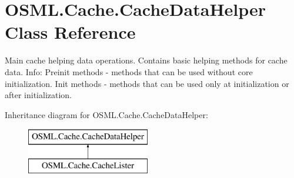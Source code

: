 \hypertarget{classOSML_1_1Cache_1_1CacheDataHelper}{}\section{O\+S\+M\+L.\+Cache.\+Cache\+Data\+Helper Class Reference}
\label{classOSML_1_1Cache_1_1CacheDataHelper}


Main cache helping data operations. Contains basic helping methods for cache data. Info\+: Preinit methods -\/ methods that can be used without core initialization. Init methods -\/ methods that can be used only at initialization or after initialization.  


Inheritance diagram for O\+S\+M\+L.\+Cache.\+Cache\+Data\+Helper\+:\begin{figure}[H]
\begin{center}
\leavevmode
\includegraphics[height=2.000000cm]{classOSML_1_1Cache_1_1CacheDataHelper}
\end{center}
\end{figure}
